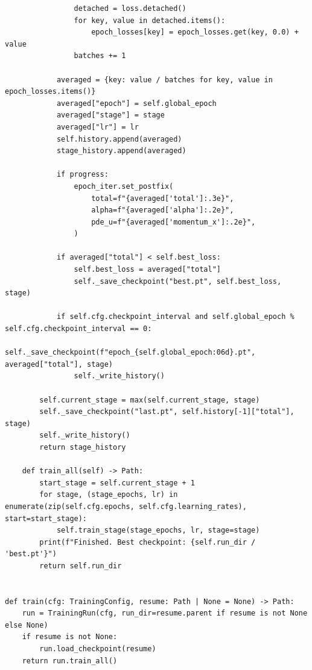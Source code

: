 \begin{lstlisting}
                detached = loss.detached()
                for key, value in detached.items():
                    epoch_losses[key] = epoch_losses.get(key, 0.0) + value
                batches += 1

            averaged = {key: value / batches for key, value in epoch_losses.items()}
            averaged["epoch"] = self.global_epoch
            averaged["stage"] = stage
            averaged["lr"] = lr
            self.history.append(averaged)
            stage_history.append(averaged)

            if progress:
                epoch_iter.set_postfix(
                    total=f"{averaged['total']:.3e}",
                    alpha=f"{averaged['alpha']:.2e}",
                    pde_u=f"{averaged['momentum_x']:.2e}",
                )

            if averaged["total"] < self.best_loss:
                self.best_loss = averaged["total"]
                self._save_checkpoint("best.pt", self.best_loss, stage)

            if self.cfg.checkpoint_interval and self.global_epoch % self.cfg.checkpoint_interval == 0:
                self._save_checkpoint(f"epoch_{self.global_epoch:06d}.pt", averaged["total"], stage)
                self._write_history()

        self.current_stage = max(self.current_stage, stage)
        self._save_checkpoint("last.pt", self.history[-1]["total"], stage)
        self._write_history()
        return stage_history

    def train_all(self) -> Path:
        start_stage = self.current_stage + 1
        for stage, (stage_epochs, lr) in enumerate(zip(self.cfg.epochs, self.cfg.learning_rates), start=start_stage):
            self.train_stage(stage_epochs, lr, stage=stage)
        print(f"Finished. Best checkpoint: {self.run_dir / 'best.pt'}")
        return self.run_dir


def train(cfg: TrainingConfig, resume: Path | None = None) -> Path:
    run = TrainingRun(cfg, run_dir=resume.parent if resume is not None else None)
    if resume is not None:
        run.load_checkpoint(resume)
    return run.train_all()



\end{lstlisting}
